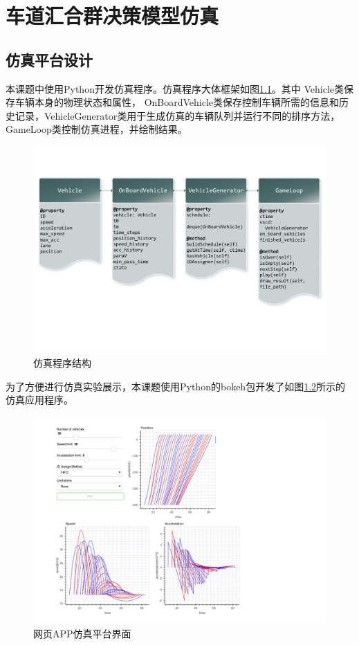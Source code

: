\chapter{车道汇合群决策模型仿真}
\label{cha:sim}

\section{仿真平台设计}
本课题中使用{\ttfamily Python}开发仿真程序。仿真程序大体框架如图\ref{fig:ss}。其中 {\ttfamily Vehicle}类保存车辆本身的物理状态和属性， {\ttfamily OnBoardVehicle}类保存控制车辆所需的信息和历史记录，{\ttfamily VehicleGenerator}类用于生成仿真的车辆队列并运行不同的排序方法，{\ttfamily GameLoop}类控制仿真进程，并绘制结果。
\begin{figure}
\centering
\includegraphics[width=15cm,trim={0 4cm 0 2cm},clip]{figures/software_structure.pdf}
\caption{仿真程序结构}
\label{fig:ss}
\end{figure}

为了方便进行仿真实验展示，本课题使用{\ttfamily Python}的{\ttfamily bokeh}包开发了如图\ref{fig:app}所示的仿真应用程序。
\begin{figure}
\centering
\includegraphics[angle=270,trim={0 0 0 10cm},clip,width=13cm]{figures/app.pdf}
\caption{网页APP仿真平台界面}
\label{fig:app}
\end{figure}

